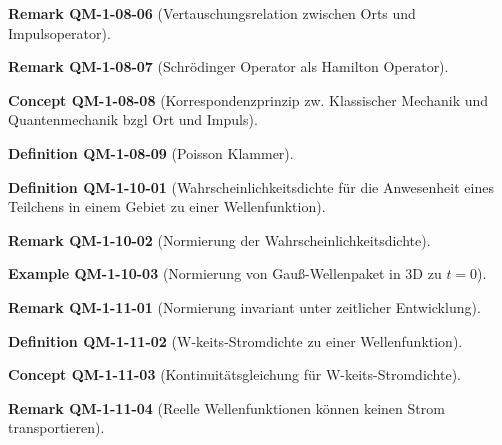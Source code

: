 \documentclass[10pt, letterpaper]{article}
\newcommand{\CustomHeading}[3]{%
  \par\medskip\noindent%
  \textbf{#1 #2} \textnormal{(#3)}.\enskip%
}
\newenvironment{DEF}[2]{\CustomHeading{Definition}{#1}{#2}}{}
\newenvironment{REM}[2]{\CustomHeading{Remark}{#1}{#2}}{}
\newenvironment{EXA}[2]{\CustomHeading{Example}{#1}{#2}}{}
\newenvironment{CONC}[2]{\CustomHeading{Concept}{#1}{#2}}{}
\begin{document}
\begin{REM}{QM-1-08-06}{Vertauschungsrelation zwischen Orts und Impulsoperator}
\end{REM}

\begin{REM}{QM-1-08-07}{Schrödinger Operator als Hamilton Operator}
\end{REM}

\begin{CONC}{QM-1-08-08}{Korrespondenzprinzip zw. Klassischer Mechanik und Quantenmechanik bzgl Ort und Impuls}
\end{CONC}

\begin{DEF}{QM-1-08-09}{Poisson Klammer}
\end{DEF}

\begin{DEF}{QM-1-10-01}{Wahrscheinlichkeitsdichte für die Anwesenheit eines Teilchens in einem Gebiet zu einer Wellenfunktion}
\end{DEF}

\begin{REM}{QM-1-10-02}{Normierung der Wahrscheinlichkeitsdichte}
\end{REM}

\begin{EXA}{QM-1-10-03}{Normierung von Gauß-Wellenpaket in 3D zu $t=0$}
\end{EXA}

\begin{REM}{QM-1-11-01}{Normierung invariant unter zeitlicher Entwicklung}
\end{REM}

\begin{DEF}{QM-1-11-02}{W-keits-Stromdichte zu einer Wellenfunktion}
\end{DEF}

\begin{CONC}{QM-1-11-03}{Kontinuitätsgleichung für W-keits-Stromdichte}
\end{CONC}

\begin{REM}{QM-1-11-04}{Reelle Wellenfunktionen können keinen Strom transportieren}
\end{REM}
\end{document}
